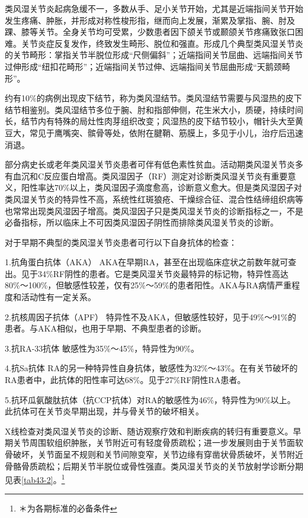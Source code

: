 类风湿关节炎起病急缓不一，多数从手、足小关节开始，尤其是近端指间关节开始发生疼痛、肿胀，并形成对称性梭形指，继而向上发展，渐累及掌指、腕、肘及踝、膝等关节。全身关节均可受累，少数患者因下颌关节或颞颌关节疼痛致张口困难。关节炎症反复发作，终致发生畸形、脱位和强直。形成几个典型类风湿关节炎的关节畸形：掌指关节半脱位形成“尺侧偏斜”；近端指间关节屈曲、远端指间关节过伸形成“纽扣花畸形”；近端指间关节过伸、远端指间关节屈曲形成“天鹅颈畸形”。

约有10\%的病例出现皮下结节，称为类风湿结节。类风湿结节需要与风湿热的皮下结节相鉴别。类风湿结节多位于腕、肘和指部伸侧，花生米大小，质硬，持续时间长，结节内有特殊的局灶性肉芽组织改变；风湿热的皮下结节较小，帽针头大至黄豆大，常见于鹰嘴突、髌骨等处，依附在腱鞘、筋膜上，多见于小儿，治疗后迅速消退。

部分病史长或老年类风湿关节炎患者可伴有低色素性贫血。活动期类风湿关节炎多有血沉和C反应蛋白增高。类风湿因子（RF）测定对诊断类风湿关节炎有重要意义，阳性率达70\%以上，类风湿因子滴度愈高，诊断意义愈大。但是类风湿因子对类风湿关节炎的特异性不高，系统性红斑狼疮、干燥综合征、混合性结缔组织病等也常常出现类风湿因子增高。类风湿因子只是类风湿关节炎的诊断指标之一，不是必备指标，所以临床上不可因类风湿因子阴性而排除类风湿关节炎的诊断。

对于早期不典型的类风湿关节炎患者可行以下自身抗体的检查：

1.抗角蛋白抗体（AKA）
AKA在早期RA，甚至在出现临床症状之前数年就可查出。见于34\%RF阴性的患者。它是类风湿关节炎最特异的标记物，特异性高达80\%～100\%，但敏感性较差，仅有25\%～59\%的患者阳性。AKA与RA病情严重程度和活动性有一定关系。

2.抗核周因子抗体（APF）
特异性不及AKA，但敏感性较好，见于49\%～91\%的患者。与AKA相似，也用于早期、不典型患者的诊断。

3.抗RA-33抗体 敏感性为35\%～45\%，特异性为90\%。

4.抗Sa抗体
RA的另一种特异性自身抗体，敏感性为32\%～43\%。在有关节破坏的RA患者中，此抗体的阳性率可达68\%。见于27\%RF阴性RA患者。

5.抗环瓜氨酸肽抗体（抗CCP抗体）对RA的敏感性为46\%，特异性为90\%以上。此抗体可在关节炎早期出现，并与骨关节的破坏相关。

X线检查对类风湿关节炎的诊断、随访观察疗效和判断疾病的转归有重要意义。早期关节周围软组织肿胀，关节附近可有轻度骨质疏松；进一步发展则由于关节面软骨破坏，关节面呈不规则和关节间隙变窄，关节边缘有穿凿状骨质破坏，关节附近骨骼骨质疏松；后期关节半脱位或骨性强直。类风湿关节炎的关节放射学诊断分期见表\ref{tab43-2}。\footnote{＊为各期标准的必备条件}

